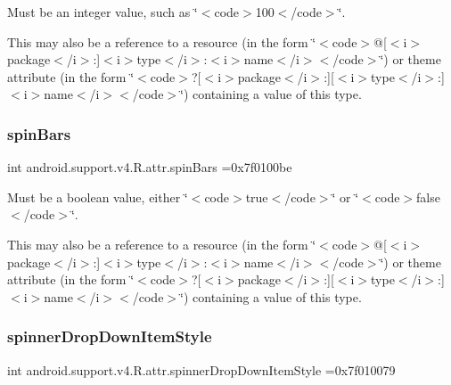 Must be an integer value, such as \char`\"{}$<$code$>$100$<$/code$>$\char`\"{}. 

This may also be a reference to a resource (in the form \char`\"{}$<$code$>$@\mbox{[}$<$i$>$package$<$/i$>$\+:\mbox{]}$<$i$>$type$<$/i$>$\+:$<$i$>$name$<$/i$>$$<$/code$>$\char`\"{}) or theme attribute (in the form \char`\"{}$<$code$>$?\mbox{[}$<$i$>$package$<$/i$>$\+:\mbox{]}\mbox{[}$<$i$>$type$<$/i$>$\+:\mbox{]}$<$i$>$name$<$/i$>$$<$/code$>$\char`\"{}) containing a value of this type. \mbox{\label{classandroid_1_1support_1_1v4_1_1R_1_1attr_a5694b740c43f723768b3b198529ace85}} 
\subsubsection{\texorpdfstring{spin\+Bars}{spinBars}}
{\footnotesize\ttfamily int android.\+support.\+v4.\+R.\+attr.\+spin\+Bars =0x7f0100be\hspace{0.3cm}{\ttfamily [static]}}

Must be a boolean value, either \char`\"{}$<$code$>$true$<$/code$>$\char`\"{} or \char`\"{}$<$code$>$false$<$/code$>$\char`\"{}. 

This may also be a reference to a resource (in the form \char`\"{}$<$code$>$@\mbox{[}$<$i$>$package$<$/i$>$\+:\mbox{]}$<$i$>$type$<$/i$>$\+:$<$i$>$name$<$/i$>$$<$/code$>$\char`\"{}) or theme attribute (in the form \char`\"{}$<$code$>$?\mbox{[}$<$i$>$package$<$/i$>$\+:\mbox{]}\mbox{[}$<$i$>$type$<$/i$>$\+:\mbox{]}$<$i$>$name$<$/i$>$$<$/code$>$\char`\"{}) containing a value of this type. \mbox{\label{classandroid_1_1support_1_1v4_1_1R_1_1attr_aa39c1fbe3c6886d7c6b48dfd88da6591}} 
\subsubsection{\texorpdfstring{spinner\+Drop\+Down\+Item\+Style}{spinnerDropDownItemStyle}}
{\footnotesize\ttfamily int android.\+support.\+v4.\+R.\+attr.\+spinner\+Drop\+Down\+Item\+Style =0x7f010079\hspace{0.3cm}{\ttfamily [static]}}

